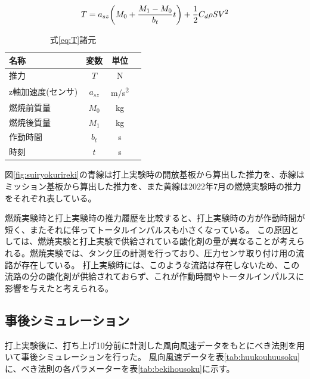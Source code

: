 \documentclass[a4paper,11pt,uplatex]{jsarticle}
\begin{document}
\begin{equation}
	T = a_{sz}\qty(M_0 + \frac{M_1-M_0}{b_t}t)+\frac{1}{2}C_d \rho S V^2
	\label{eq:T}
\end{equation}

\begin{table}[H]
	\centering
	\caption{式\eqref{eq:T}諸元}
	\label{tab:eqshogen}
	\begin{tabular}{lccr}
		\toprule
		名称         & 変数       & 単位         \\
		\midrule
		推力         & $T$      & \si{N}     \\
		z軸加速度(センサ) & $a_{sz}$ & \si{m/s^2} \\
		燃焼前質量      & $M_0$    & \si{kg}    \\
		燃焼後質量      & $M_1$    & \si{kg}    \\
		作動時間       & $b_t$    & \si{s}     \\
		時刻         & $t$      & \si{s}     \\
		\bottomrule
	\end{tabular}
\end{table}

図\ref{fig:suiryokurireki}の青線は打上実験時の開放基板から算出した推力を、赤線はミッション基板から算出した推力を、また黄線は2022年7月の燃焼実験時の推力をそれぞれ表している。

燃焼実験時と打上実験時の推力履歴を比較すると、打上実験時の方が作動時間が短く、またそれに伴ってトータルインパルスも小さくなっている。
この原因としては、燃焼実験と打上実験で供給されている酸化剤の量が異なることが考えられる。燃焼実験では、タンク圧の計測を行っており、圧力センサ取り付け用の流路が存在している。
打上実験時には、このような流路は存在しないため、この流路の分の酸化剤が供給されておらず、これが作動時間やトータルインパルスに影響を与えたと考えられる。

\subsection{事後シミュレーション}
打上実験後に、打ち上げ10分前に計測した風向風速データをもとにべき法則を用いて事後シミュレーションを行った。
風向風速データを表\ref{tab:huukouhuusoku}に、べき法則の各パラメーターを表\ref{tab:bekihousoku}に示す。
\end{document}
